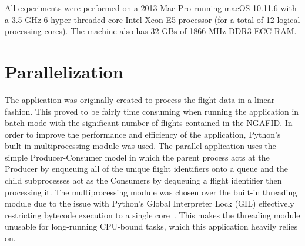 	All experiments were performed on a 2013 Mac Pro running macOS 10.11.6 with a 3.5 GHz 6 hyper-threaded core Intel Xeon E5 processor (for a total of 12 logical processing cores). The machine also has 32 GBs of 1866 MHz DDR3 ECC RAM.


\section{Parallelization} \label{sec:parallelization}

	The application was originally created to process the flight data in a linear fashion.  This proved to be fairly time consuming when running the application in batch mode with the significant number of flights contained in the NGAFID.  In order to improve the performance and efficiency of the application, Python's built-in multiprocessing module was used.  The parallel application uses the simple Producer-Consumer model in which the parent process acts at the Producer by enqueuing all of the unique flight identifiers onto a queue and the child subprocesses act as the Consumers by dequeuing a flight identifier then processing it.  The multiprocessing module was chosen over the built-in threading module due to the issue with Python's Global Interpreter Lock (GIL) effectively restricting bytecode execution to a single core~\cite{Beazley:2010:Understanding-t}.  This makes the threading module unusable for long-running CPU-bound tasks, which this application heavily relies on.